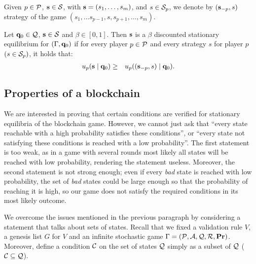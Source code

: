 \documentclass{article}
\begin{document}
Given $p \in \mathcal{P}$, $\mathbf{s} \in \mathcal{S}$, with $\mathbf{s} = (s_1, \ldots, s_m)$, and $s \in \mathcal{S}_p$, we denote by $(\mathbf{s}_{-p}, s)$ strategy of the game $(s_1, \ldots s_{p-1},s,s_{p+1}, \ldots, s_{m})$.
\begin{mydef}
Let $\mathbf{q}_0 \in \mathcal{Q}$, $\mathbf{s} \in \mathcal{S}$ and $\beta \in [0,1]$. Then $\mathbf{s}$ is a $\beta$ discounted stationary equilibrium for $(\Gamma, \mathbf{q}_0)$ if for every player $p \in \mathcal{P}$ and every strategy $s$ for player $p$ $(s \in\mathcal{S}_p)$, it holds that:
\begin{eqnarray*}
u_p(\mathbf{s} \mid \mathbf{q}_0)  & \geq  & u_p ((\mathbf{s}_{-p},s) \mid \mathbf{q}_0).
\end{eqnarray*}
\end{mydef}

\subsection{Properties of a blockchain}

We are interested in proving that certain conditions are verified for stationary equilibria of the blockchain game. 
However, we cannot just ask that ``every state reachable with a high probability satisfies these conditions'', or 
``every state not satisfying these conditions is reached with a low probability''. 
The first statement is too weak, as in a game with several rounds 
most likely all states will be reached with low probability, rendering the statement useless. Moreover, the second statement is not strong enough; even if every \emph{bad} state is reached with 
low probability, the set of \emph{bad} states could be large enough so that the probability of reaching it is high, so our game does not satisfy the  required conditions in its most likely outcome. 

We overcome the issues mentioned in the previous paragraph by considering a statement that talks about sets of states. Recall that we  fixed a validation rule $V$, a genesis list $G$ for $V$ and an infinite stochastic game $\Gamma = (\mathcal{P},\mathcal{A},\mathcal{Q},\mathcal{R},\mathbf{Pr})$. Moreover,  define a condition $\mathcal{C}$ on the set of states $\mathcal{Q}$ simply as a subset of $\mathcal{Q}$ ($\mathcal{C} \subseteq \mathcal{Q}$). 
\end{document}
